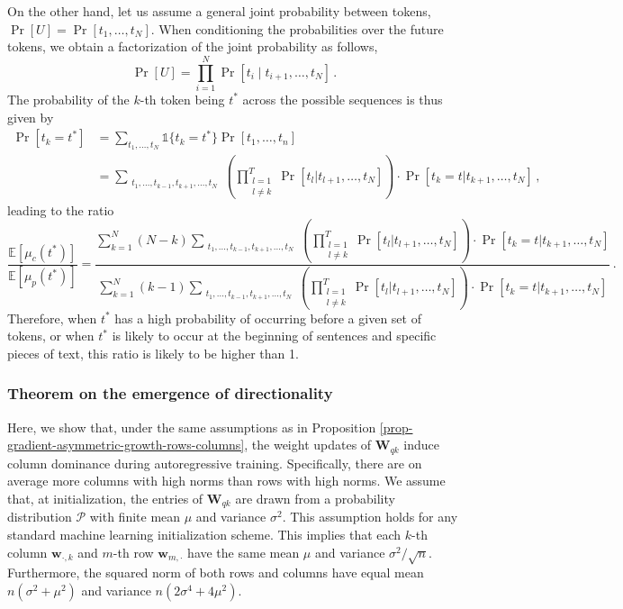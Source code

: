 On the other hand, let us assume a general joint probability between tokens, $\Pr[U] = \Pr[t_1,\dots,t_N]$.
%
When conditioning the probabilities over the future tokens, we obtain a factorization of the joint probability as follows,
%
%
\begin{equation}
    \Pr[U] = \prod_{i=1}^{N} \Pr[t_i \mid t_{i+1}, \dots, t_N]\,.
\end{equation}
%
The probability of the $k$-th token being $t^*$ across the possible sequences is thus given by
%
\begin{equation}
\begin{split}
\Pr[t_k = t^*] & = \sum_{t_1, \dots,t_N} \mathds{1}\{t_k = t^*\}\Pr[t_1,\dots,t_n] \\
&= \sum_{\substack{t_1, \dots, t_{k-1}, t_{k+1}, \dots, t_N}} \left( \prod_{\substack{l=1 \\ l \neq k}}^{T} \Pr[t_l | t_{l+1}, \dots, t_N] \right) \cdot \Pr[t_k = t | t_{k+1}, \dots, t_N] \,,
\end{split}
\end{equation}
%
leading to the ratio
%
\begin{equation}
    \frac{\mathbb{E}[\mu_c(t^*)]}{\mathbb{E}[\mu_p(t^*)]} = \frac{\sum_{k=1}^N (N-k)\sum_{\substack{t_1, \dots, t_{k-1}, t_{k+1}, \dots, t_N}} \left( \prod_{\substack{l=1 \\ l \neq k}}^{T} \Pr[t_l | t_{l+1}, \dots, t_N] \right) \cdot \Pr[t_k = t | t_{k+1}, \dots, t_N]}{\sum_{k=1}^N(k-1)\sum_{\substack{t_1, \dots, t_{k-1}, t_{k+1}, \dots, t_N}} \left( \prod_{\substack{l=1 \\ l \neq k}}^{T} \Pr[t_l | t_{l+1}, \dots, t_N] \right) \cdot \Pr[t_k = t | t_{k+1}, \dots, t_N]} \,.
\end{equation}
%
Therefore, when $t^*$ has a high probability of occurring before a given set of tokens, or when $t^*$ is likely to occur at the beginning of sentences and specific pieces of text, this ratio is likely to be higher than 1.






\subsubsection{Theorem on the emergence of directionality}
\label{supp-math-theo-gradient-directionality}
%
Here, we show that, under the same assumptions as in Proposition \ref{prop-gradient-asymmetric-growth-rows-columns}, the weight updates of $\bm{W}_{qk}$ induce column dominance during autoregressive training. 
%
Specifically, there are on average more columns with high norms than rows with high norms.
%
We assume that, at initialization, the entries of $\bm{W}_{qk}$ are drawn from a probability distribution $\mathcal{P}$ with finite mean $\mu$ and variance $\sigma^2$. 
%
This assumption holds for any standard machine learning initialization scheme.
%
This implies that each $k$-th column $\bm{w}_{\cdot,k}$ and $m$-th row $\bm{w}_{m, \cdot}$ have the same mean $\mu$ and variance $\sigma^2/\sqrt{n}$.
%
Furthermore, the squared norm of both rows and columns have equal mean $n(\sigma^2 + \mu^2)$ and variance $n(2\sigma^4 + 4\mu^2)$.
%


